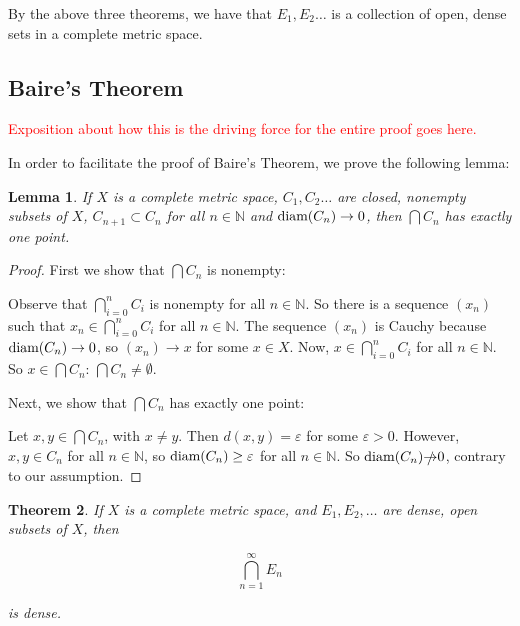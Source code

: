 \documentclass{amsart}
\newcommand{\vep}{\varepsilon}
\newcommand{\N}{\mathbb{N}}
\newcommand{\diam}{\text{\rm diam}}
\newtheorem{thm}{Theorem}[section]
\newtheorem{lem}[thm]{Lemma}
\theoremstyle{definition}
\begin{document}
By the above three theorems, we have that $E_1, E_2 \ldots$ is a collection of open, dense sets in a complete metric space. 

\subsection{Baire's Theorem}

\textcolor{red}{Exposition about how this is the driving force for the entire proof goes here.}

In order to facilitate the proof of Baire's Theorem, we prove the following lemma:

\begin{lem}
If $X$ is a complete metric space, $C_1, C_2 \ldots$ are closed, nonempty subsets of $X$, $C_{n+1} \subset C_n$ for all $n \in \N$ and $\diam(C_n) \to 0$, then $\bigcap C_n$ has exactly one point.
\end{lem}

\begin{proof}
First we show that $\bigcap C_n$ is nonempty: 

Observe that $\bigcap\limits_{i=0}^n C_i$ is nonempty for all $n \in \N$. 
So there is a sequence $(x_n)$ such that $x_n \in \bigcap\limits_{i=0}^n C_i$ for all $n \in \N$. 
The sequence $(x_n)$ is Cauchy because $\diam(C_n) \to 0$, so $(x_n) \to x$ for some $x \in X$.
Now, $x \in \bigcap\limits_{i=0}^n C_i$ for all $n \in \N$.
So $x \in \bigcap C_n$: $\bigcap C_n \neq \emptyset$.

Next, we show that $\bigcap C_n$ has exactly one point:

Let $x, y \in \bigcap C_n$, with $x \neq y$. 
Then $d(x,y) = \vep$ for some $\vep >0$. 
However, $x,y \in C_n$ for all $n \in \N$,
so $\diam(C_n) \geq \vep$ for all $n \in \N$. 
So $\diam(C_n) \slashed{\to} 0$, contrary to our assumption.
\end{proof}

\begin{thm}If $X$ is a complete metric space, and $E_1, E_2, \ldots$ are dense, open subsets of $X$, then

\begin{displaymath}
\bigcap\limits_{n = 1}^{\infty} E_n
\end{displaymath}

is dense.
\end{thm}
\end{document}
